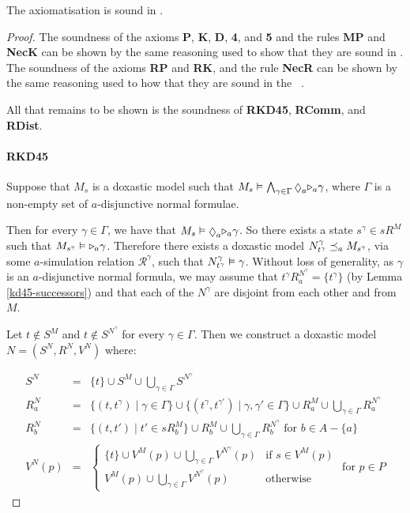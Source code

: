 \begin{lemma}
The axiomatisation \axiomKDF{} is sound in \logicKDF{}.
\end{lemma}

\begin{proof}
The soundness of the axioms {\bf P}, {\bf K}, {\bf D}, {\bf 4}, and {\bf 5} and the
rules {\bf MP} and {\bf NecK} can be shown by the same reasoning used to show
that they are sound in \logicKD{}. The soundness of the axioms {\bf RP} and {\bf
RK}, and the rule {\bf NecR} can be shown by the same reasoning used to how
that they are sound in the \logicKiF{}~\cite{french2010future}.

All that remains to be shown is the soundness of {\bf RKD45}, {\bf RComm}, and
{\bf RDist}.

\paragraph{RKD45}
Suppose that $M_s$ is a doxastic model such that $M_s \entails \bigwedge_{\gamma
\in \Gamma} \suspects_a \somerefs_a \gamma$, where $\Gamma$ is a non-empty set of
$a$-disjunctive normal formulae.

Then for every $\gamma \in \Gamma$, we have that $M_s \entails \suspects_a
\somerefs_a \gamma$. So there exists a state $s^\gamma \in sR^M$ such
that $M_{s^\gamma} \vDash {\ensuremath{\mathopen{\triangleright}}}_a \gamma$. Therefore there exists a
doxastic model $N^\gamma_{t^\gamma} \preceq_a M_{s^\gamma}$, via some
$a$-simulation relation $\mathcal{R}^\gamma$, such that $N^\gamma_{t^\gamma}
\vDash \gamma$.  Without loss of generality, as $\gamma$ is an $a$-disjunctive
normal formula, we may assume that $t^\gamma R^{N^\gamma}_a = \{t^\gamma\}$ (by
Lemma \ref{kd45-successors}) and that each of the $N^\gamma$ are disjoint from
each other and from $M$.

Let $t \notin S^M$ and $t \notin S^{N^\gamma}$ for every $\gamma \in \Gamma$.
Then we construct a doxastic model $N = (S^N, R^N, V^N)$ where:

\begin{eqnarray*}
S^N &=& \{t\} \cup S^M \cup \bigcup_{\gamma \in \Gamma} S^{N^\gamma}\\
R^N_a &=& \{(t, t^\gamma) \mid \gamma \in \Gamma\} 
\cup \{(t^\gamma, t^{\gamma'}) \mid \gamma, \gamma' \in \Gamma\} 
\cup R^M_a
\cup \bigcup_{\gamma \in \Gamma} R^{N^\gamma}_a\\
R^N_b &=& \{(t, t') \mid t' \in sR^M_b\}
\cup R^M_b
\cup \bigcup_{\gamma \in \Gamma} R^{N^\gamma}_b \text{ for $b \in A - \{a\}$}\\
V^N(p) &=& 
\begin{cases}
\{t\} \cup V^M(p) \cup \bigcup_{\gamma \in \Gamma} V^{N^\gamma}(p) & \text{if $s
\in V^M(p)$}\\
V^M(p) \cup \bigcup_{\gamma \in \Gamma} V^{N^\gamma}(p) & \text{otherwise}
\end{cases}
\text{ for $p \in P$}
\end{eqnarray*}


\end{proof}
